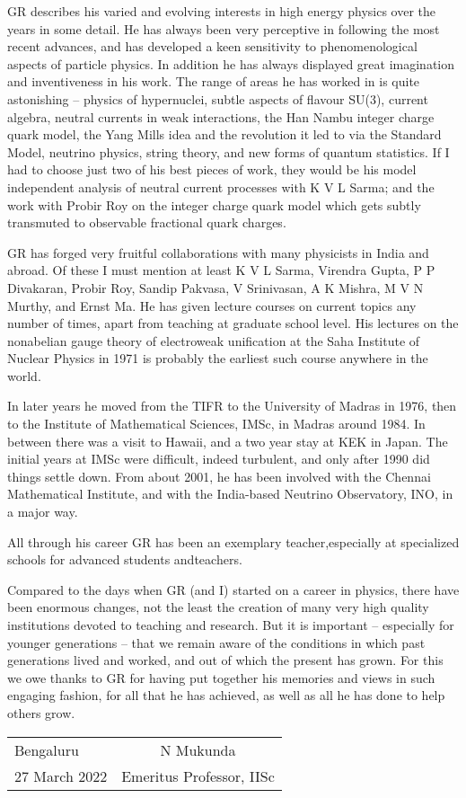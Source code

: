 GR describes his varied and evolving interests in high energy physics 
over the years in some detail. He has always been very perceptive in 
following the most recent advances, and has deve\-loped a keen 
sensitivity to phenomenological aspects of particle physics. In 
addition he has always displayed great imagination and inventiveness in 
his work. The range of areas he has worked in is quite astonishing – 
physics of hypernuclei, subtle aspects of flavour SU(3), current 
algebra, neutral currents in weak interactions, the Han Nambu integer 
charge quark model, the Yang Mills idea and the revolution it led to 
via the Standard Model, neutrino physics, string theory, and new forms 
of quantum statistics. If I had to choose just two of his best pieces 
of work, they would be his model independent analysis of neutral 
current processes with K V L Sarma; and the work with Probir Roy on 
the integer charge quark model which gets subtly transmuted to 
observable fractional quark charges.
\medskip

GR has forged very fruitful collaborations with many physicists in 
India and abroad. Of these I must mention at least K V L Sarma, 
Virendra Gupta, P P Divakaran, Probir Roy, Sandip Pakvasa, V 
Srinivasan, A K Mishra, M V N Murthy, and Ernst Ma. He has given 
lecture courses on current topics any number of times, apart from 
teaching at graduate school level. His lectures on the nonabelian gauge 
theory of electroweak unification at the Saha Institute of Nuclear 
Physics in 1971 is probably the earliest such course anywhere in the 
world.
\medskip

In later years he moved from the TIFR to the University of Madras in 
1976, then to the Institute of Mathematical Sciences, IMSc, in Madras 
around 1984. In between there was a visit to Hawaii, and a two year 
stay at KEK in Japan. The initial years at IMSc were difficult, indeed 
turbulent, and only after 1990 did things settle down. From about 2001, 
he has been involved with the Chennai Mathematical Institute, and with 
the India-based Neutrino Observatory, INO, in a major way.


All through his career GR has been an exemplary teacher,\break especially at 
specialized schools for advanced students and\break teachers.  


Compared to the days when GR (and I) started on a career in physics, 
there have been enormous changes, not the least the crea\-tion of many 
very high quality institutions devoted to teaching and research. But it 
is important – especially for younger generations – that we remain 
aware of the conditions in which past generations lived and worked, 
and out of which the present has grown. For this we owe thanks to GR 
for having put together his memories and views in such engaging fashion, 
for all that he has achieved, as well as all he has done to help 
others grow.
\vskip 1cm

\begin{flushleft}
\begin{tabular}{l@{\phantom{WWWWWWWWW}}c}
Bengaluru & \quad N Mukunda\\
27 March 2022 & Emeritus Professor, IISc
\end{tabular}
\end{flushleft}
